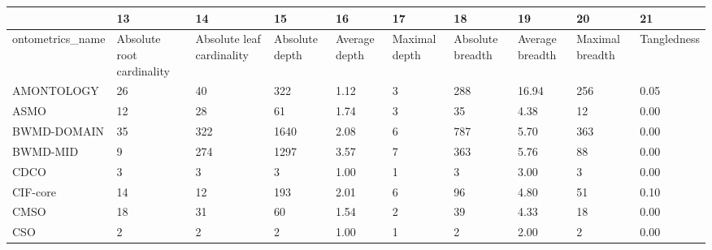 \begin{tabular}{llllllllll}
\toprule
{} &                         13 &                         14 &              15 &             16 &             17 &                18 &               19 &               20 &           21 \\
\midrule
ontometrics\_name            &  Absolute root cardinality &  Absolute leaf cardinality &  Absolute depth &  Average depth &  Maximal depth &  Absolute breadth &  Average breadth &  Maximal breadth &  Tangledness \\
AMONTOLOGY                  &                         26 &                         40 &             322 &           1.12 &              3 &               288 &            16.94 &              256 &         0.05 \\
ASMO                        &                         12 &                         28 &              61 &           1.74 &              3 &                35 &             4.38 &               12 &         0.00 \\
BWMD-DOMAIN                 &                         35 &                        322 &            1640 &           2.08 &              6 &               787 &             5.70 &              363 &         0.00 \\
BWMD-MID                    &                          9 &                        274 &            1297 &           3.57 &              7 &               363 &             5.76 &               88 &         0.00 \\
CDCO                        &                          3 &                          3 &               3 &           1.00 &              1 &                 3 &             3.00 &                3 &         0.00 \\
CIF-core                    &                         14 &                         12 &             193 &           2.01 &              6 &                96 &             4.80 &               51 &         0.10 \\
CMSO                        &                         18 &                         31 &              60 &           1.54 &              2 &                39 &             4.33 &               18 &         0.00 \\
CSO                         &                          2 &                          2 &               2 &           1.00 &              1 &                 2 &             2.00 &                2 &         0.00 \\

\end{tabular}

